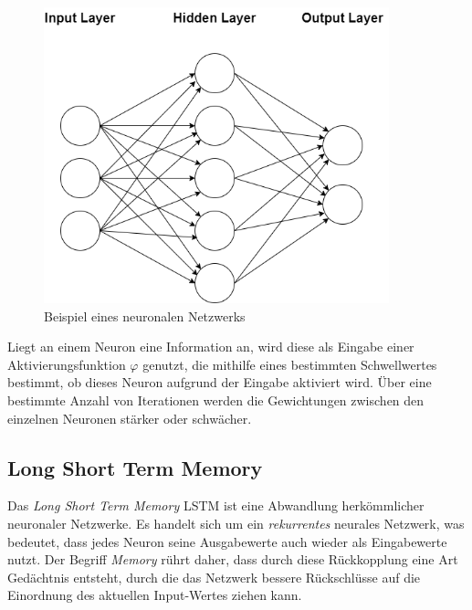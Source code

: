 \begin{figure}[h]
    \centering
    \includegraphics[width=10.0cm]{pic/NN.png}
    \caption{Beispiel eines neuronalen Netzwerks}
    \label{fig:NN}
\end{figure}

Liegt an einem Neuron eine Information an, wird diese als Eingabe einer Aktivierungsfunktion $\varphi$ genutzt, 
die mithilfe eines bestimmten Schwellwertes bestimmt, ob dieses Neuron aufgrund der Eingabe aktiviert wird. Über eine 
bestimmte Anzahl von Iterationen werden die Gewichtungen zwischen den einzelnen Neuronen stärker oder schwächer.


\subsection{Long Short Term Memory}
Das \textit{Long Short Term Memory} LSTM ist eine Abwandlung herkömmlicher neuronaler Netzwerke. Es handelt sich um ein
\textit{rekurrentes} neurales Netzwerk, was bedeutet, dass jedes Neuron seine Ausgabewerte auch wieder als Eingabewerte
nutzt. Der Begriff \textit{Memory} rührt daher, dass durch diese Rückkopplung eine Art Gedächtnis entsteht, durch 
die das Netzwerk bessere Rückschlüsse auf die Einordnung des aktuellen Input-Wertes ziehen kann.\\

